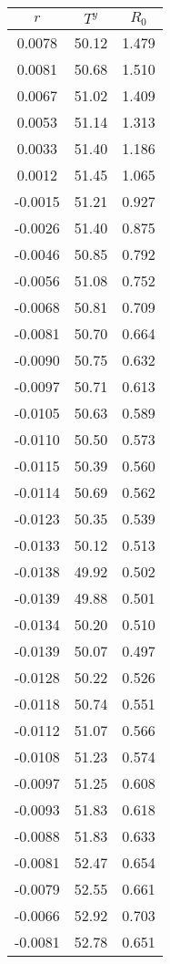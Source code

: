 \begin{tabular}{ccc}
  \hline
$r$ & $T^y$ & $R_0$ \\ 
  \hline
0.0078 & 50.12 & 1.479 \\ 
  0.0081 & 50.68 & 1.510 \\ 
  0.0067 & 51.02 & 1.409 \\ 
  0.0053 & 51.14 & 1.313 \\ 
  0.0033 & 51.40 & 1.186 \\ 
  0.0012 & 51.45 & 1.065 \\ 
  -0.0015 & 51.21 & 0.927 \\ 
  -0.0026 & 51.40 & 0.875 \\ 
  -0.0046 & 50.85 & 0.792 \\ 
  -0.0056 & 51.08 & 0.752 \\ 
  -0.0068 & 50.81 & 0.709 \\ 
  -0.0081 & 50.70 & 0.664 \\ 
  -0.0090 & 50.75 & 0.632 \\ 
  -0.0097 & 50.71 & 0.613 \\ 
  -0.0105 & 50.63 & 0.589 \\ 
  -0.0110 & 50.50 & 0.573 \\ 
  -0.0115 & 50.39 & 0.560 \\ 
  -0.0114 & 50.69 & 0.562 \\ 
  -0.0123 & 50.35 & 0.539 \\ 
  -0.0133 & 50.12 & 0.513 \\ 
  -0.0138 & 49.92 & 0.502 \\ 
  -0.0139 & 49.88 & 0.501 \\ 
  -0.0134 & 50.20 & 0.510 \\ 
  -0.0139 & 50.07 & 0.497 \\ 
  -0.0128 & 50.22 & 0.526 \\ 
  -0.0118 & 50.74 & 0.551 \\ 
  -0.0112 & 51.07 & 0.566 \\ 
  -0.0108 & 51.23 & 0.574 \\ 
  -0.0097 & 51.25 & 0.608 \\ 
  -0.0093 & 51.83 & 0.618 \\ 
  -0.0088 & 51.83 & 0.633 \\ 
  -0.0081 & 52.47 & 0.654 \\ 
  -0.0079 & 52.55 & 0.661 \\ 
  -0.0066 & 52.92 & 0.703 \\ 
  -0.0081 & 52.78 & 0.651 \\ 
   \hline
\end{tabular}
